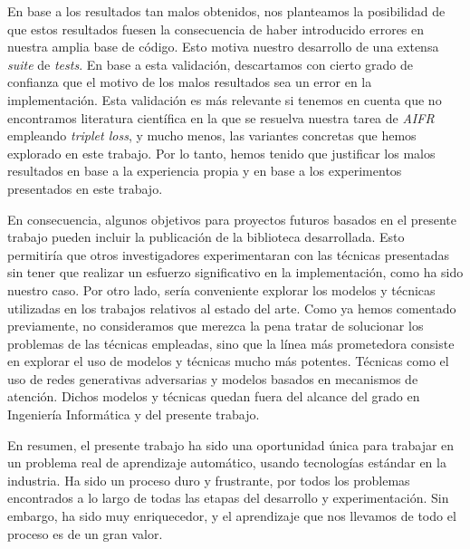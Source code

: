 En base a los resultados tan malos obtenidos, nos planteamos la posibilidad de que estos resultados fuesen la consecuencia de haber introducido errores en nuestra amplia base de código. Esto motiva nuestro desarrollo de una extensa \textit{suite} de \textit{tests}. En base a esta validación, descartamos con cierto grado de confianza que el motivo de los malos resultados sea un error en la implementación. Esta validación es más relevante si tenemos en cuenta que no encontramos literatura científica en la que se resuelva nuestra tarea de \textit{AIFR} empleando \textit{triplet loss}, y mucho menos, las variantes concretas que hemos explorado en este trabajo. Por lo tanto, hemos tenido que justificar los malos resultados en base a la experiencia propia y en base a los experimentos presentados en este trabajo.

En consecuencia, algunos objetivos para proyectos futuros basados en el presente trabajo pueden incluir la publicación de la biblioteca desarrollada. Esto permitiría que otros investigadores experimentaran con las técnicas presentadas sin tener que realizar un esfuerzo significativo en la implementación, como ha sido nuestro caso. Por otro lado, sería conveniente explorar los modelos y técnicas utilizadas en los trabajos relativos al estado del arte. Como ya hemos comentado previamente, no consideramos que merezca la pena tratar de solucionar los problemas de las técnicas empleadas, sino que la línea más prometedora consiste en explorar el uso de modelos y técnicas mucho más potentes. Técnicas como el uso de redes generativas adversarias y modelos basados en mecanismos de atención. Dichos modelos y técnicas quedan fuera del alcance del grado en Ingeniería Informática y del presente trabajo.

En resumen, el presente trabajo ha sido una oportunidad única para trabajar en un problema real de aprendizaje automático, usando tecnologías estándar en la industria. Ha sido un proceso duro y frustrante, por todos los problemas encontrados a lo largo de todas las etapas del desarrollo y experimentación. Sin embargo, ha sido muy enriquecedor, y el aprendizaje que nos llevamos de todo el proceso es de un gran valor.
